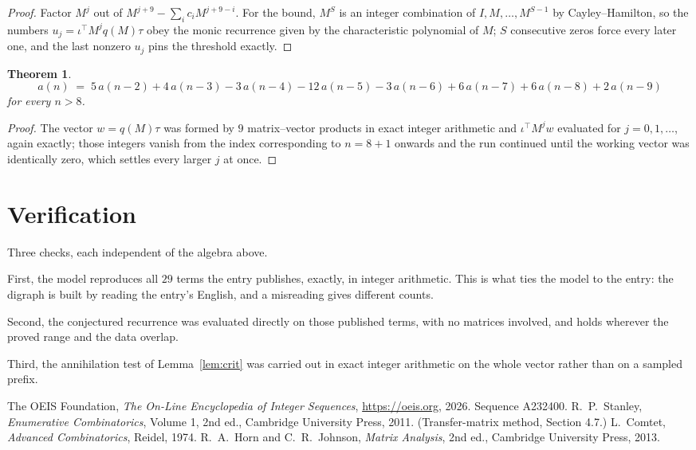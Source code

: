\documentclass[11pt,a4paper]{article}
\theoremstyle{plain}
\newtheorem{theorem}{Theorem}
\theoremstyle{definition}
\begin{document}
\begin{proof}
Factor $M^{j}$ out of $M^{j+9}-\sum_ic_iM^{j+9-i}$. For the bound, $M^{S}$
is an integer combination of $I,M,\dots,M^{S-1}$ by Cayley--Hamilton, so the numbers
$u_j=\iota^{\!\top}M^{j}q(M)\tau$ obey the monic recurrence given by the characteristic
polynomial of $M$; $S$ consecutive zeros force every later one, and the last nonzero $u_j$
pins the threshold exactly.
\end{proof}

\begin{theorem}
\[
a(n)\;=\;5\,a(n-2) + 4\,a(n-3) - 3\,a(n-4) - 12\,a(n-5) - 3\,a(n-6) + 6\,a(n-7) + 6\,a(n-8) + 2\,a(n-9)
\]
for every $n>8$.
\end{theorem}

\begin{proof}
The vector $w=q(M)\tau$ was formed by $9$ matrix--vector products in exact integer
arithmetic and $\iota^{\!\top}M^{j}w$ evaluated for $j=0,1,\dots$, again exactly; those
integers vanish from the index corresponding to $n=8+1$ onwards and the run continued
until the working vector was identically zero, which settles every larger $j$ at once.
\end{proof}

\section{Verification}

Three checks, each independent of the algebra above.

First, the model reproduces all $29$ terms the entry publishes, exactly, in integer
arithmetic. This is what ties the model to the entry: the digraph is built by reading the
entry's English, and a misreading gives different counts.

Second, the conjectured recurrence was evaluated directly on those published terms, with no
matrices involved, and holds wherever the proved range and the data overlap.

Third, the annihilation test of Lemma~\ref{lem:crit} was carried out in exact integer
arithmetic on the whole vector rather than on a sampled prefix.

\begin{thebibliography}{9}
 The OEIS Foundation, \emph{The On-Line Encyclopedia of Integer
Sequences}, \url{https://oeis.org}, 2026. Sequence A232400.
 R.~P.~Stanley, \emph{Enumerative Combinatorics}, Volume 1, 2nd ed.,
Cambridge University Press, 2011. (Transfer-matrix method, Section 4.7.)
 L.~Comtet, \emph{Advanced Combinatorics}, Reidel, 1974.
 R.~A.~Horn and C.~R.~Johnson, \emph{Matrix Analysis}, 2nd ed., Cambridge
University Press, 2013.
\end{thebibliography}
\end{document}
